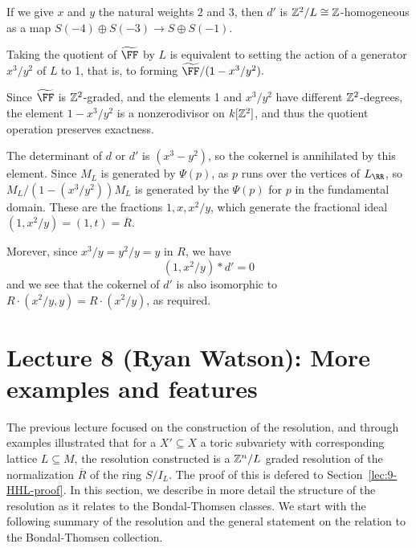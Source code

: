 \documentclass{amsart}
\begin{document}
\begin{example} 
If we give $x$ and $y$ the natural weights $2$ and 3, then $d'$ is $\mathbb Z^2/L \cong \mathbb Z$-homogeneous as a map $S(-4) \oplus S(-3) \to S\oplus S(-1)$.

Taking the quotient of $\tF$ by $L$ is equivalent to setting the action of a generator $x^{3}/y^{2}$ of $L$ to 1, that
is, to forming $\tF/(1-x^{3}/y^{2}).$


Since $\tF$ is $\mathbb Z^{2}$-graded, and the elements 1 and $x^{3}/y^{2}$ have
different $\mathbb Z^{2}$-degrees, the element $1-x^{3}/y^{2}$ is a nonzerodivisor on $k[\mathbb Z^{2}]$, and thus
the quotient operation preserves exactness.

The determinant of $d$ or $d'$ is 
$(x^3-y^2)$, so the cokernel is annihilated by this element.
Since $M_L$ is generated by
$\Psi(p)$, as $p$ runs over the vertices of $L_\RR$, so $M_L/(1-(x^3/y^2))M_L$
is generated by the $\Psi(p)$ for $p$ in the fundamental domain. 
These are the fractions $1,x,x^2/y$, which generate
the fractional ideal $(1, x^2/y) = (1,t)  = \overline R$.

Morever, since $x^3/y = y^2/y = y$ in $R$, we have
$$
(1, x^2/y)*d' = 0
$$
and we see that the cokernel of $d'$ is also isomorphic to 
$R\cdot(x^2/y, y) = R\cdot (x^2/y)$, as required.
\end{example}


\section{Lecture 8 (Ryan Watson): More examples and features}\label{lec:8-HHL-examples}

The previous lecture focused on the construction of the resolution, and through examples illustrated that for a $X'\subseteq X$ a toric subvariety with corresponding lattice $L\subseteq M$, the resolution constructed is a $\mathbb Z^{n}/L$ graded resolution of the normalization $\overline{R}$ of the ring $S/I_L$. The proof of this is defered to Section~\ref{lec:9-HHL-proof}. In this section, we describe in more detail the structure of the resolution as it relates to the Bondal-Thomsen classes. We start with the following summary of the resolution and the general statement on the relation to the Bondal-Thomsen collection.
\end{document}

